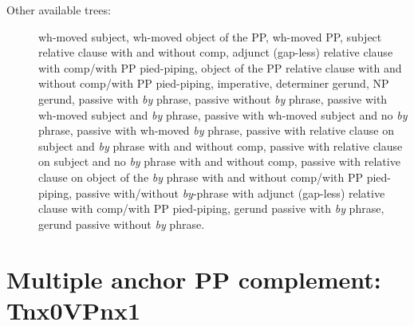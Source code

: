 \begin{description}
\item[Other available trees:] wh-moved subject, wh-moved object of the PP, 
wh-moved PP, subject relative clause with and without comp, 
adjunct (gap-less) relative clause with comp/with PP pied-piping, 
object of the PP relative clause with and without comp/with PP pied-piping, 
imperative, determiner gerund, NP gerund, passive with {\it by} phrase, 
passive without {\it by} phrase, passive with wh-moved subject and {\it by} 
phrase, passive with wh-moved subject and no {\it by} phrase, passive with 
wh-moved {\it by} phrase, passive with relative clause on subject and {\it by} phrase with and without comp, passive with relative clause on subject and no 
{\it by} phrase with and without comp, 
passive with relative clause on object of the {\it by} phrase with and without comp/with PP 
pied-piping, passive with/without {\it by}-phrase with adjunct (gap-less) relative clause 
with comp/with PP pied-piping, gerund 
passive with {\it by} phrase, gerund passive without {\it by} phrase. 
 
\end{description} 
 
\section{Multiple anchor PP complement: Tnx0VPnx1}\label{verbs,prepositional complement} 
\label{nx0VPnx1-family} 
 

